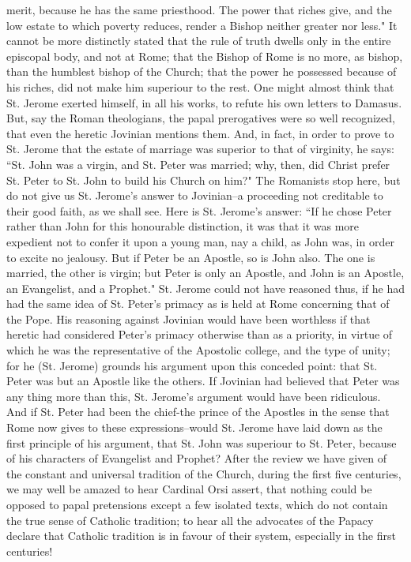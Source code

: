 merit, because he has the same priesthood. The power that riches give, and the low estate to which poverty reduces, render a Bishop neither greater nor less." It cannot be more distinctly stated that the rule of truth dwells only in the entire episcopal body, and not at Rome; that the Bishop of Rome is no more, as bishop, than the humblest bishop of the Church; that the power he possessed because of his riches, did not make him superiour to the rest. One might almost think that St. Jerome exerted himself, in all his works, to refute his own letters to Damasus. But, say the Roman theologians, the papal prerogatives were so well recognized, that even the heretic Jovinian mentions them. And, in fact, in order to prove to St. Jerome that the estate of marriage was superior to that of virginity, he says: “St. John was a virgin, and St. Peter was married; why, then, did Christ prefer St. Peter to St. John to build his Church on him?" The Romanists stop here, but do not give us St. Jerome's answer to Jovinian--a proceeding not creditable to their good faith, as we shall see. Here is St. Jerome's answer: “If he chose Peter rather than John for this honourable distinction, it was that it was more expedient not to confer it upon a young man, nay a child, as John was, in order to excite no jealousy. But if Peter be an Apostle, so is John also. The one is married, the other is virgin; but Peter is only an Apostle, and John is an Apostle, an Evangelist, and a Prophet." St. Jerome could not have reasoned thus, if he had had the same idea of St. Peter's primacy as is held at Rome concerning that of the Pope. His reasoning against Jovinian would have been worthless if that heretic had considered Peter's primacy otherwise than as a priority, in virtue of which he was the representative of the Apostolic college, and the type of unity; for he (St. Jerome) grounds his argument upon this conceded point: that St. Peter was but an Apostle like the others. If Jovinian had believed that Peter was any thing more than this, St. Jerome's argument would have been ridiculous. And if St. Peter had been the chief-the prince of the Apostles in the sense that Rome now gives to these expressions--would St. Jerome have laid down as the first principle of his argument, that St. John was superiour to St. Peter, because of his characters of Evangelist and Prophet? After the review we have given of the constant and universal tradition of the Church, during the first five centuries, we may well be amazed to hear Cardinal Orsi assert, that nothing could be opposed to papal pretensions except a few isolated texts, which do not contain the true sense of Catholic tradition; to hear all the advocates of the Papacy declare that Catholic tradition is in favour of their system, especially in the first centuries!

